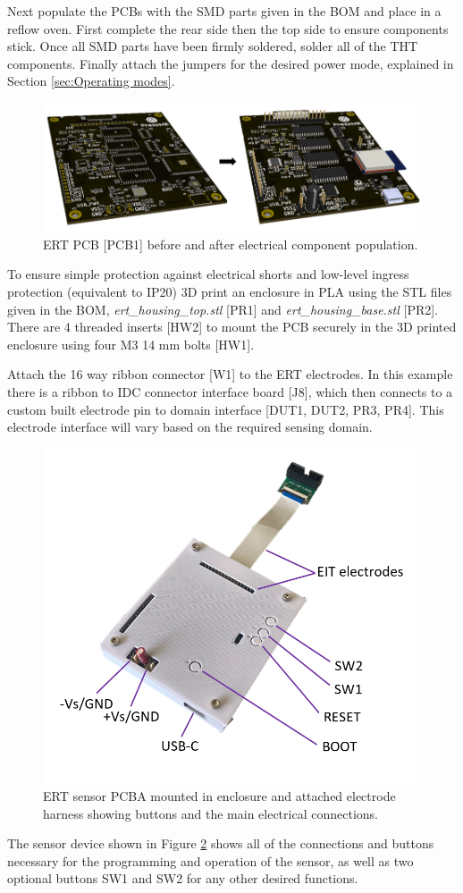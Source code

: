 Next populate the PCBs with the SMD parts given in the BOM and place in a reflow oven. First complete the rear side then the top side to ensure components stick. Once all SMD parts have been firmly soldered, solder all of the THT components. Finally attach the jumpers for the desired power mode, explained in Section \ref{sec:Operating modes}.
\begin{figure}[H]
\centering
\includegraphics[width=0.8\linewidth]{Figures/HV_ERT_sensor_PCB_unpop2pop.png}
\caption{ERT PCB [PCB1] before and after electrical component population.}
\label{fig:pcb_to_pcba}
\end{figure}
To ensure simple protection against electrical shorts and low-level ingress protection (equivalent to IP20) 3D print an enclosure in PLA using the STL files given in the BOM, \textit{ert\_housing\_top.stl} [PR1] and \textit{ert\_housing\_base.stl} [PR2]. There are 4 threaded inserts [HW2] to mount the PCB securely in the 3D printed enclosure using four M3 14 mm bolts [HW1].

Attach the 16 way ribbon connector [W1] to the ERT electrodes. In this example there is a ribbon to IDC connector interface board [J8], which then connects to a custom built electrode pin to domain interface [DUT1, DUT2, PR3, PR4]. This electrode interface will vary based on the required sensing domain.
\begin{figure}[H]
\centering
\includegraphics[width=0.6\linewidth]{Figures/ERT_PCB_assembled_in_housing_labelled.png}
\caption{ERT sensor PCBA mounted in enclosure and attached electrode harness showing buttons and the main electrical connections.}
\label{fig:ert_sensor_in_housing}
\end{figure}
The sensor device shown in Figure \ref{fig:ert_sensor_in_housing} shows all of the connections and buttons necessary for the programming and operation of the sensor, as well as two optional buttons SW1 and SW2 for any other desired functions.

